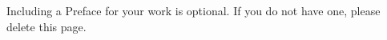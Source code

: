 \begin{preface}

Including a Preface for your work is optional. If you do not have one, please delete this page.
\end{preface}